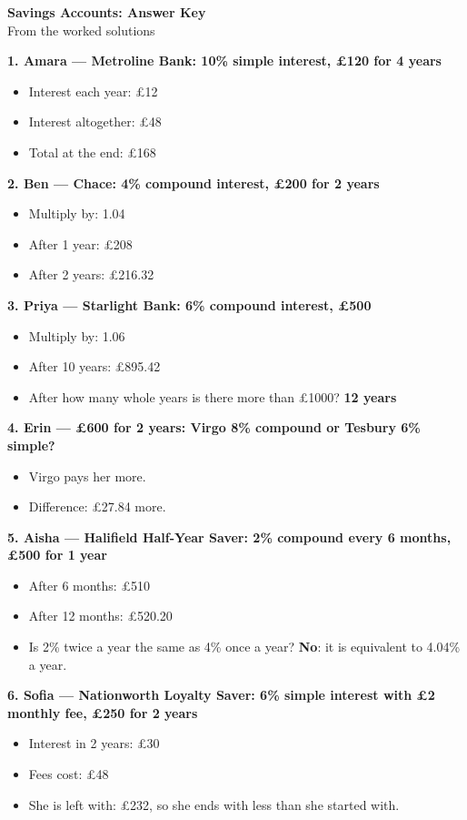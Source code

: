 \documentclass[12pt]{article}
\begin{document}
\begin{center}
{\LARGE\bfseries Savings Accounts: Answer Key}\\[2mm]
{\normalsize From the worked solutions}
\end{center}

\vspace{4mm}

\textbf{1. Amara --- Metroline Bank: 10\% simple interest, \pounds 120 for 4 years}
\begin{itemize}
  \item Interest each year: \pounds 12
  \item Interest altogether: \pounds 48
  \item Total at the end: \pounds 168
\end{itemize}

\textbf{2. Ben --- Chace: 4\% compound interest, \pounds 200 for 2 years}
\begin{itemize}
  \item Multiply by: 1.04
  \item After 1 year: \pounds 208
  \item After 2 years: \pounds 216.32
\end{itemize}

\textbf{3. Priya --- Starlight Bank: 6\% compound interest, \pounds 500}
\begin{itemize}
  \item Multiply by: 1.06
  \item After 10 years: \pounds 895.42
  \item After how many whole years is there more than \pounds 1000? \textbf{12 years}
\end{itemize}

\textbf{4. Erin --- \pounds 600 for 2 years: Virgo 8\% compound or Tesbury 6\% simple?}
\begin{itemize}
  \item Virgo pays her more.
  \item Difference: \pounds 27.84 more.
\end{itemize}

\textbf{5. Aisha --- Halifield Half-Year Saver: 2\% compound every 6 months, \pounds 500 for 1 year}
\begin{itemize}
  \item After 6 months: \pounds 510
  \item After 12 months: \pounds 520.20
  \item Is 2\% twice a year the same as 4\% once a year? \textbf{No}: it is equivalent to 4.04\% a year.
\end{itemize}

\textbf{6. Sofia --- Nationworth Loyalty Saver: 6\% simple interest with \pounds 2 monthly fee, \pounds 250 for 2 years}
\begin{itemize}
  \item Interest in 2 years: \pounds 30
  \item Fees cost: \pounds 48
  \item She is left with: \pounds 232, so she ends with less than she started with.
\end{itemize}
\end{document}
